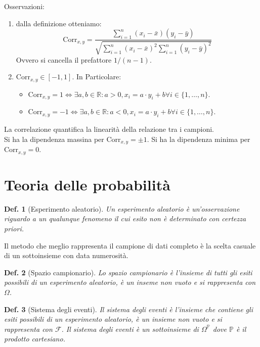 \documentclass{article}
\newtheorem{definition}{Def.}[section]
\begin{document}
Osservazioni:
\begin{enumerate}
	\item dalla definizione otteniamo:
		\begin{equation}
			\text{Corr}_{x,y} = \frac{\sum_{i=1}^n (x_i - \bar{x})(y_i - \bar{y})}
			{\sqrt{\sum_{i=1}^n (x_i - \bar{x})^2 \sum_{i=1}^n (y_i - \bar{y})^2}}
		\end{equation}
		Ovvero si cancella il prefattore $1/(n-1)$.

	\item $\text{Corr}_{x,y} \in [-1, 1]$. In Particolare:
		\begin{itemize}
			\item $\text{Corr}_{x,y} = 1 \iff \exists a, b \in \mathbb{R}: a>0,
				x_i = a \cdot y_i + b \forall i \in \{1, \dots, n\}$.
			\item $\text{Corr}_{x,y} = -1 \iff \exists a, b \in \mathbb{R}: a<0,
				x_i = a \cdot y_i + b \forall i \in \{1, \dots, n\}$.
		\end{itemize}
\end{enumerate}
La correlazione quantifica la linearità della relazione tra i campioni.\\
Si ha la dipendenza massina per $\text{Corr}_{x,y} = \pm 1$.
Si ha la dipendenza minima per $\text{Corr}_{x,y} = 0$.

\section{Teoria delle probabilità}
\begin{definition}[Esperimento aleatorio] Un esperimento aleatorio è un'osservazione
riguardo a un qualunque fenomeno il cui esito non è determinato con certezza
priori.
\end{definition}

Il metodo che meglio rappresenta il campione di dati completo è la scelta
casuale di un sottoinsieme con data numerosità.

\begin{definition}[Spazio campionario] Lo spazio campionario è l'insieme di tutti gli
esiti possibili di un esperimento aleatorio, è un inseme non vuoto e si
rappresenta con $\Omega$.
\end{definition}

\begin{definition}[Sistema degli eventi] Il sistema degli eventi è l'insieme che
contiene gli esiti possibili di un esperimento aleatorio, è un
insieme non vuoto e si rappresenta con $\mathcal{F}$. Il sistema degli eventi è
un sottoinsieme di $\Omega^{\mathbb{P}}$ dove $\mathbb{P}$ è il prodotto
cartesiano.
\end{definition}
\end{document}
